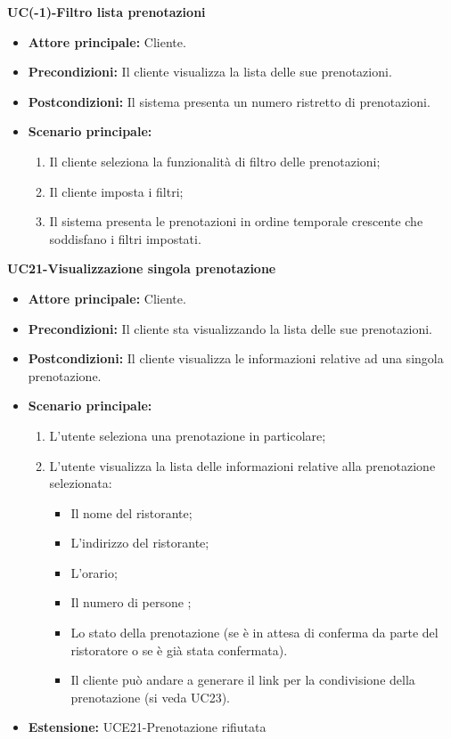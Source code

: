 \textbf{UC(-1)-Filtro lista prenotazioni}
\begin{itemize}
    \item \textbf{Attore principale: } Cliente.
    \item \textbf{Precondizioni: }Il cliente visualizza la lista delle sue prenotazioni.
    \item \textbf{Postcondizioni: }Il sistema presenta un numero ristretto di prenotazioni.
    \item \textbf{Scenario principale:} 
        \begin{enumerate}
            \item Il cliente seleziona la funzionalità di filtro delle prenotazioni;
            \item Il cliente imposta i filtri;
            \item Il sistema presenta le prenotazioni in ordine temporale crescente che soddisfano i filtri impostati.
        \end{enumerate}
\end{itemize}

\textbf{UC21-Visualizzazione singola prenotazione}
\begin{itemize}
    \item \textbf{Attore principale: } Cliente.
    \item \textbf{Precondizioni: }Il cliente sta visualizzando la lista delle sue prenotazioni.
    \item \textbf{Postcondizioni: }Il cliente visualizza le informazioni relative ad una singola prenotazione.
    \item \textbf{Scenario principale:} 
        \begin{enumerate}
            \item L'utente seleziona una prenotazione in particolare;
            \item L'utente visualizza la lista delle informazioni relative alla prenotazione selezionata:
            \begin{itemize}
                \item Il nome del ristorante;
                \item L'indirizzo del ristorante;
                \item L'orario;
                \item Il numero di persone ;
                \item Lo stato della prenotazione (se è in attesa di conferma da parte del ristoratore
                o se è già stata confermata).
            \item Il cliente può andare a generare il link per la condivisione della prenotazione (si veda UC23).
            \end{itemize}
        \end{enumerate}
    \item \textbf{Estensione: }UCE21-Prenotazione rifiutata
\end{itemize}

